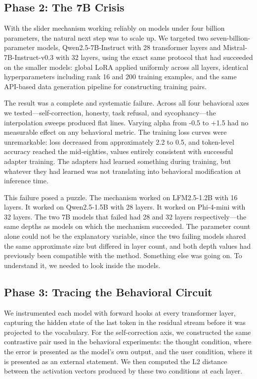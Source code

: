 \documentclass[11pt,a4paper]{article}
\begin{document}
\subsection{Phase 2: The 7B Crisis}

With the slider mechanism working reliably on models under four billion parameters, the natural next step was to scale up. We targeted two seven-billion-parameter models, Qwen2.5-7B-Instruct with 28 transformer layers and Mistral-7B-Instruct-v0.3 with 32 layers, using the exact same protocol that had succeeded on the smaller models: global LoRA applied uniformly across all layers, identical hyperparameters including rank 16 and 200 training examples, and the same API-based data generation pipeline for constructing training pairs.

The result was a complete and systematic failure. Across all four behavioral axes we tested---self-correction, honesty, task refusal, and sycophancy---the interpolation sweeps produced flat lines. Varying alpha from -0.5 to +1.5 had no measurable effect on any behavioral metric. The training loss curves were unremarkable: loss decreased from approximately 2.2 to 0.5, and token-level accuracy reached the mid-eighties, values entirely consistent with successful adapter training. The adapters had learned something during training, but whatever they had learned was not translating into behavioral modification at inference time.

This failure posed a puzzle. The mechanism worked on LFM2.5-1.2B with 16 layers. It worked on Qwen2.5-1.5B with 28 layers. It worked on Phi-4-mini with 32 layers. The two 7B models that failed had 28 and 32 layers respectively---the same depths as models on which the mechanism succeeded. The parameter count alone could not be the explanatory variable, since the two failing models shared the same approximate size but differed in layer count, and both depth values had previously been compatible with the method. Something else was going on. To understand it, we needed to look inside the models.

\subsection{Phase 3: Tracing the Behavioral Circuit}

We instrumented each model with forward hooks at every transformer layer, capturing the hidden state of the last token in the residual stream before it was projected to the vocabulary. For the self-correction axis, we constructed the same contrastive pair used in the behavioral experiments: the thought condition, where the error is presented as the model's own output, and the user condition, where it is presented as an external statement. We then computed the L2 distance between the activation vectors produced by these two conditions at each layer.
\end{document}
